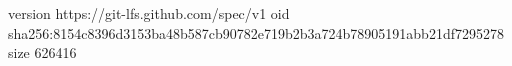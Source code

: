 version https://git-lfs.github.com/spec/v1
oid sha256:8154c8396d3153ba48b587cb90782e719b2b3a724b78905191abb21df7295278
size 626416
